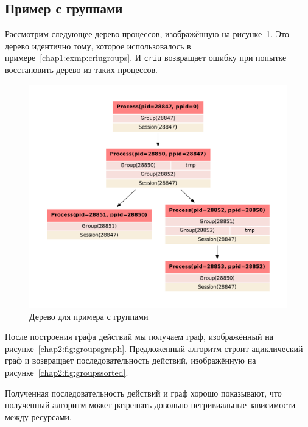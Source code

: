 \subsection{Пример с группами}

Рассмотрим следующее дерево процессов, изображённую на рисунке~\ref{chap2:fig:groupspstree}. Это дерево идентично тому, которое использовалось в примере~\ref{chap1:exmp:criugroups}. И \texttt{criu} возвращает ошибку при попытке восстановить дерево из таких процессов. 


\begin{figure}[ht!]
	\centering
	\includegraphics[scale=0.4]{fig/examplePstree.pdf}
\caption{Дерево для примера с группами}
\label{chap2:fig:groupspstree}
\end{figure}

После построения графа действий мы получаем граф, изображённый на рисунке~\ref{chap2:fig:groupsgraph}. Предложенный алгоритм строит ациклический граф и возвращает последовательность действий, изображённую на рисунке~\ref{chap2:fig:groupssorted}.



Полученная последовательность действий и граф хорошо показывают, что полученный алгоритм может разрешать довольно нетривиальные зависимости между ресурсами.


